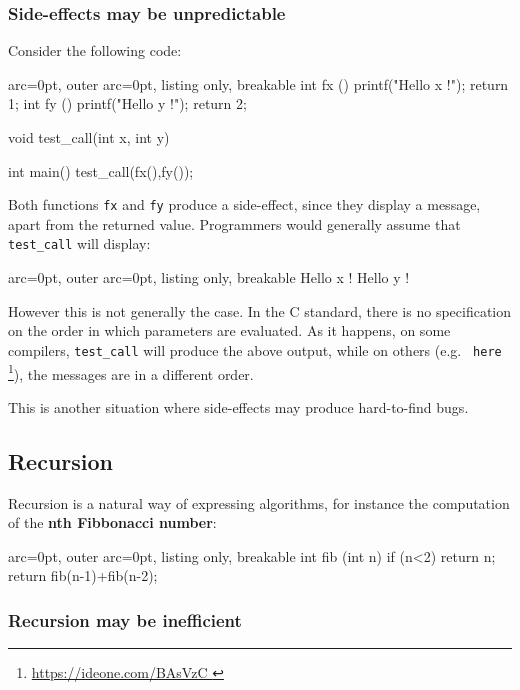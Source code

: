 \subsubsection*{ Side-effects may be unpredictable }

Consider the following code:

\begin{tcblisting}{ arc=0pt, outer arc=0pt, listing only, breakable}
int fx (){ printf("Hello x !\n"); return 1;}
int fy (){ printf("Hello y !\n"); return 2;}

void test_call(int x, int y){}

int main(){
     test_call(fx(),fy());
}

\end{tcblisting}


Both functions \texttt{fx} and \texttt{fy} produce a side-effect, since they display a message, apart from the returned value. Programmers would generally assume that \texttt{test\_call} will display:

\begin{tcblisting}{ arc=0pt, outer arc=0pt, listing only, breakable}
Hello x !
Hello y !

\end{tcblisting}


However this is not generally the case. In the C standard, there is no specification on the order in which parameters are evaluated. As it happens, on some compilers, \texttt{test\_call} will produce the above output, while on others (e.g. \texttt{ here} \footnote{\url{https://ideone.com/BAsVzC }}), the messages are in a different order.

This is another situation where side-effects may produce hard-to-find bugs.


\subsection*{ Recursion }

Recursion is a natural way of expressing algorithms, for instance the computation of the \textbf{nth Fibbonacci number}:


\begin{tcblisting}{ arc=0pt, outer arc=0pt, listing only, breakable}
int fib (int n){
        if (n<2)
                return n;
        return fib(n-1)+fib(n-2);
}

\end{tcblisting}


\subsubsection*{ Recursion may be inefficient }

